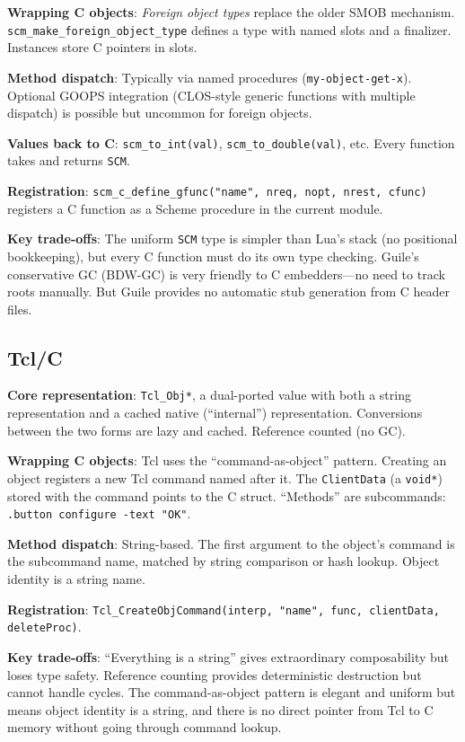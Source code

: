 \documentclass[11pt]{article}
\begin{document}
\textbf{Wrapping C objects}: \emph{Foreign object types} replace the
older SMOB mechanism.
\texttt{scm\_make\_foreign\_object\_type} defines a type with named
slots and a finalizer.  Instances store C pointers in slots.

\textbf{Method dispatch}: Typically via named procedures
(\texttt{my-object-get-x}).  Optional GOOPS integration (CLOS-style
generic functions with multiple dispatch) is possible but uncommon for
foreign objects.

\textbf{Values back to C}: \texttt{scm\_to\_int(val)},
\texttt{scm\_to\_double(val)}, etc.  Every function takes and returns
\texttt{SCM}.

\textbf{Registration}:
\texttt{scm\_c\_define\_gfunc("name", nreq, nopt, nrest, cfunc)}
registers a C function as a Scheme procedure in the current module.

\textbf{Key trade-offs}: The uniform \texttt{SCM} type is simpler
than Lua's stack (no positional bookkeeping), but every C function
must do its own type checking.  Guile's conservative GC (BDW-GC) is
very friendly to C embedders---no need to track roots manually.  But
Guile provides no automatic stub generation from C header files.


\subsection{Tcl/C}
\label{sec:tcl}

\textbf{Core representation}: \texttt{Tcl\_Obj*}, a dual-ported value
with both a string representation and a cached native (``internal'')
representation.  Conversions between the two forms are lazy and
cached.  Reference counted (no GC).

\textbf{Wrapping C objects}: Tcl uses the ``command-as-object''
pattern.  Creating an object registers a new Tcl command named after
it.  The \texttt{ClientData} (a \texttt{void*}) stored with the
command points to the C struct.  ``Methods'' are subcommands:
\texttt{.button configure -text "OK"}.

\textbf{Method dispatch}: String-based.  The first argument to the
object's command is the subcommand name, matched by string comparison
or hash lookup.  Object identity is a string name.

\textbf{Registration}:
\texttt{Tcl\_CreateObjCommand(interp, "name", func, clientData,
  deleteProc)}.

\textbf{Key trade-offs}: ``Everything is a string'' gives
extraordinary composability but loses type safety.  Reference counting
provides deterministic destruction but cannot handle cycles.  The
command-as-object pattern is elegant and uniform but means object
identity is a string, and there is no direct pointer from Tcl to C
memory without going through command lookup.
\end{document}
